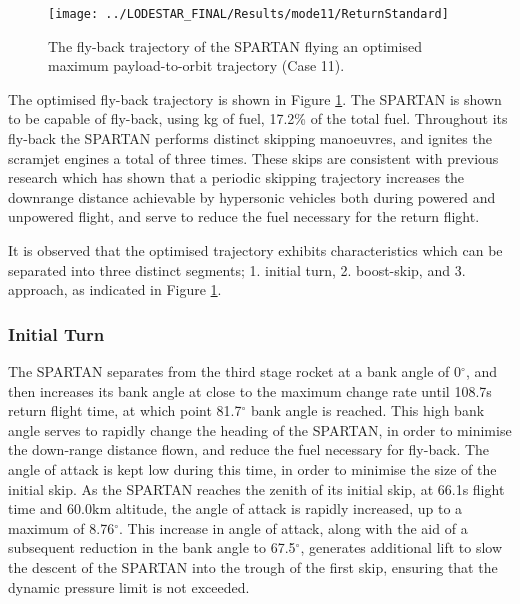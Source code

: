 \begin{figure}[ht!]
	\centering
	\texttt{[image: ../LODESTAR\_FINAL/Results/mode11/ReturnStandard]}
	\caption{The fly-back trajectory of the SPARTAN flying an optimised maximum payload-to-orbit trajectory (Case 11). }
	\label{fig:ReturnStandard}
\end{figure}

The optimised fly-back trajectory is shown in Figure \ref{fig:ReturnStandard}.
The SPARTAN is shown to be capable of fly-back, using \returnFuelStandard kg of fuel, 17.2\% of the total fuel.
Throughout its fly-back the SPARTAN performs distinct skipping manoeuvres, and ignites the scramjet engines a total of three times. 
These skips are consistent with previous research which has shown that a periodic skipping trajectory increases the downrange distance achievable by hypersonic vehicles both during powered and unpowered flight\cite{Moshman2014,Darby2011,Toso2015,Tetlow1992,Eggers1957,Kanda2007,Chai2015}, and serve to reduce the fuel necessary for the return flight. 

It is observed that the optimised trajectory exhibits characteristics which can be separated into three distinct segments; 1. initial turn, 2. boost-skip, and 3. approach, as indicated in Figure \ref{fig:ReturnStandard}. 
 
\subsubsection{ Initial Turn}
The SPARTAN separates from the third stage rocket at a bank angle of 0$^\circ$, and then increases its bank angle at close to the maximum change rate until 108.7s return flight time, at which point 81.7$^\circ$ bank angle is reached. This high bank angle serves to rapidly change the heading of the SPARTAN, in order to minimise the down-range distance flown, and reduce the fuel necessary for fly-back. 
The angle of attack is kept low during this time, in order to minimise the size of the initial skip. 
As the SPARTAN reaches the zenith of its initial skip, at 66.1s flight time and 60.0km altitude, the angle of attack is rapidly increased, up to a maximum of 8.76$^\circ$. 
This increase in angle of attack, along with the aid of a subsequent reduction in the bank angle to 67.5$^\circ$, generates additional lift to slow the descent of the SPARTAN into the trough of the first skip, ensuring that the dynamic pressure limit is not exceeded. 


